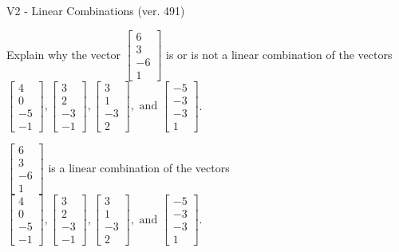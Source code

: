 \begin{exercise}
  \begin{exerciseTitle}V2 - Linear Combinations (ver. 491)\end{exerciseTitle}
  \begin{exerciseStatement}
    Explain why the vector \(\left[\begin{array}{c}
6 \\
3 \\
-6 \\
1
\end{array}\right]\)  is or is not a linear 
	combination of the vectors \(\left[\begin{array}{c}
4 \\
0 \\
-5 \\
-1
\end{array}\right] , \left[\begin{array}{c}
3 \\
2 \\
-3 \\
-1
\end{array}\right] , \left[\begin{array}{c}
3 \\
1 \\
-3 \\
2
\end{array}\right] , \text{ and } \left[\begin{array}{c}
-5 \\
-3 \\
-3 \\
1
\end{array}\right]\).
	


  \end{exerciseStatement}
  \begin{exerciseAnswer}
   \(\left[\begin{array}{c}
6 \\
3 \\
-6 \\
1
\end{array}\right]\) 
  	 is  
	a linear combination of the vectors \(\left[\begin{array}{c}
4 \\
0 \\
-5 \\
-1
\end{array}\right] , \left[\begin{array}{c}
3 \\
2 \\
-3 \\
-1
\end{array}\right] , \left[\begin{array}{c}
3 \\
1 \\
-3 \\
2
\end{array}\right] , \text{ and } \left[\begin{array}{c}
-5 \\
-3 \\
-3 \\
1
\end{array}\right]\).


\end{exerciseAnswer}
\end{exercise}

